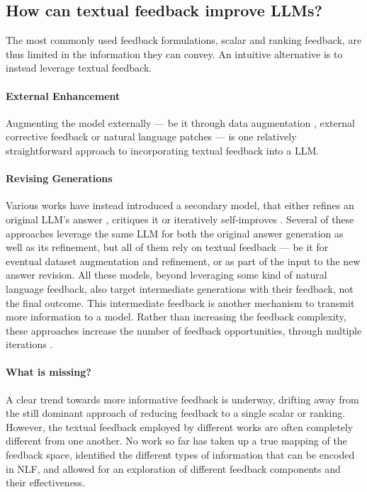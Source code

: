 \subsection{How can textual feedback improve LLMs?}

The most commonly used feedback formulations, scalar and ranking feedback, are thus limited in the information they can convey. An intuitive alternative is to instead leverage textual feedback. 

\paragraph{External Enhancement} Augmenting the model externally --- be it through data augmentation \citep{shi2022life}, external corrective feedback \citep{tandon-etal-2022-learning, madaan-etal-2022-memory, shinn2023reflexion} or natural language patches \citep{murty2022fixing} --- is one relatively straightforward approach to incorporating textual feedback into a LLM.


\paragraph{Revising Generations} Various works have instead introduced a secondary model, that either refines an original LLM's answer \citep{scheurer2022training, welleck2022generating, tandon-etal-2022-learning}, critiques it \citep{saunders2022selfcritiquing, paul2023refiner} or iteratively self-improves \citep{schick2022peer, chen2023teaching, madaan2023selfrefine}. Several of these approaches leverage the same LLM for both the original answer generation as well as its refinement, but all of them rely on textual feedback --- be it for eventual dataset augmentation and refinement, or as part of the input to the new answer revision. 
All these models, beyond leveraging some kind of natural language feedback, also target intermediate generations with their feedback, not the final outcome. This intermediate feedback is another mechanism to transmit more information to a model. Rather than increasing the feedback complexity, these approaches increase the number of feedback opportunities, through multiple iterations \citep{lightman2023lets}.



\paragraph{What is missing?}
A clear trend towards more informative feedback is underway, drifting away from the still dominant approach of reducing feedback to a single scalar or ranking. However, the textual feedback employed by different works are often completely different from one another. No work so far has taken up a true mapping of the feedback space, identified the different types of information that can be encoded in NLF, and allowed for an exploration of different feedback components and their effectiveness.


